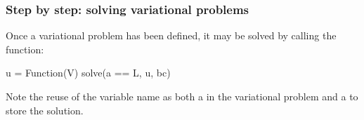 \begin{frame}[fragile]
  \frametitle{Step by step: solving variational problems}

  Once a variational problem has been defined, it may be solved
  by calling the  function:

  \begin{python}
u = Function(V)
solve(a == L, u, bc)
  \end{python}

  \bigskip

  Note the reuse of the variable name  as both a 
  in the variational problem and a  to store the solution.

\end{frame}
